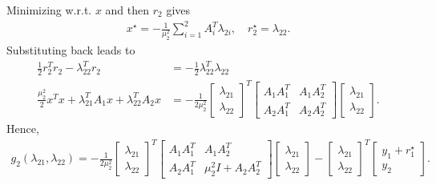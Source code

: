 \documentclass[12pt]{article}
\begin{document}
\begin{itemize}
Minimizing w.r.t. $x$ and then $r_2$ gives
%
\begin{align} \label{eq.x_r}
x^{\star} = -\frac{1}{\mu_2^2}\sum_{i=1}^{2}A_i^T\lambda_{2i}, \quad r_2^{\star} = \lambda_{22}.
\end{align}
%
Substituting back leads to
%
\begin{align}
\frac{1}{2}r_2^Tr_2 - \lambda_{22}^Tr_2 &= -\frac{1}{2}\lambda_{22}^T\lambda_{22} \\
\frac{\mu_2^2}{2} x^Tx + \lambda_{21}^TA_1x + \lambda_{22}^TA_2x
&= -\frac{1}{2\mu_2^2} \begin{bmatrix} \lambda_{21} \\ \lambda_{22} \end{bmatrix}^T
\begin{bmatrix} A_1A_1^T & A_1A_2^T \\ A_2A_1^T & A_2A_2^T \end{bmatrix}
\begin{bmatrix} \lambda_{21} \\ \lambda_{22} \end{bmatrix}.
\end{align}
%
Hence,
%
\begin{align}
g_2(\lambda_{21},\lambda_{22}) =
-\frac{1}{2\mu_2^2} \begin{bmatrix} \lambda_{21} \\ \lambda_{22} \end{bmatrix}^T
\begin{bmatrix} A_1A_1^T & A_1A_2^T \\ A_2A_1^T & \mu_2^2 I+A_2A_2^T \end{bmatrix}
\begin{bmatrix} \lambda_{21} \\ \lambda_{22} \end{bmatrix} -
\begin{bmatrix} \lambda_{21} \\ \lambda_{22} \end{bmatrix}^T \begin{bmatrix} y_1+r_1^{\star} \\ y_2 \end{bmatrix}.
\end{align}


\end{itemize}
\end{document}
